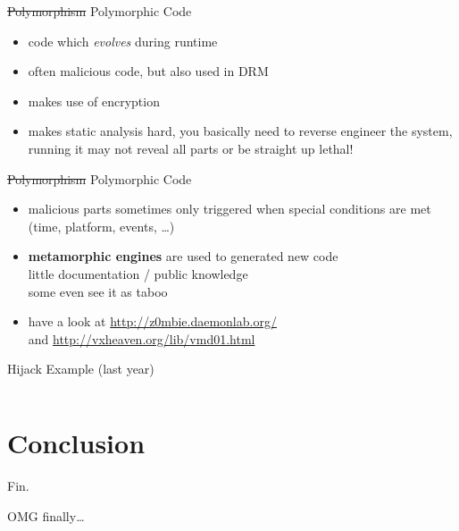 \documentclass[beamer]{uibk}
\begin{document}
\begin{frame}{\st{Polymorphism} Polymorphic Code}
    \begin{itemize}
        \item code which \emph{evolves} during runtime
        \item often malicious code, but also used in DRM
        \item makes use of encryption
        \medskip
        \pause
        \item makes static analysis hard, you basically need to reverse
            engineer the system,\\
            running it may not reveal all parts or be straight up lethal!
    \end{itemize}
\end{frame}

\begin{frame}{\st{Polymorphism} Polymorphic Code}
    \begin{itemize}
        \item malicious parts sometimes only triggered when special conditions
            are met (time, platform, events, \dots)
        \medskip
        \pause
        \item \textbf{metamorphic engines} are used to generated new code\\
            little documentation / public knowledge\\
            some even see it as taboo
        \medskip
        \pause
        \item have a look at \url{http://z0mbie.daemonlab.org/}\\
            and \url{http://vxheaven.org/lib/vmd01.html}
    \end{itemize}
\end{frame}

\begin{frame}[t,fragile]{Hijack Example (last year)}
    \begin{columns}
        \begin{column}{0.75\textwidth}
        \end{column}
        \begin{column}{0.25\textwidth}
        \end{column}
    \end{columns}
\end{frame}

\section*{Conclusion}

\begin{frame}{Fin.}
   \begin{center}
       \huge OMG finally\dots
   \end{center}
\end{frame}
\end{document}
